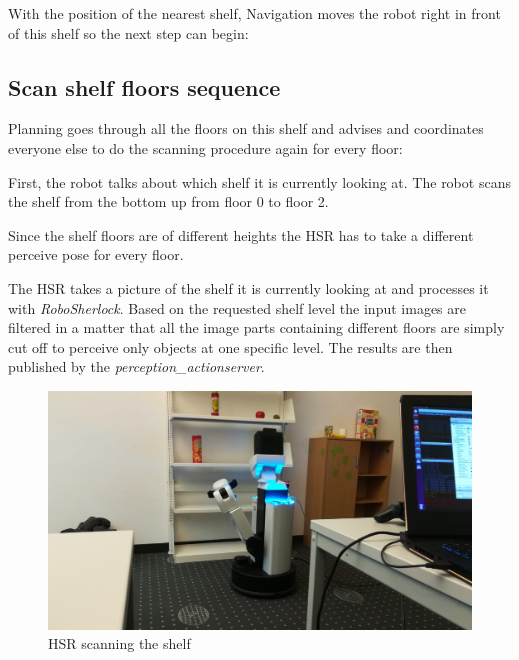 \documentclass[main.tex]{subfiles}
\begin{document}
	\begin{navigation}
	With the position of the nearest shelf, Navigation moves the robot right in front of this shelf so the next step can begin:
	\end{navigation}
	
	\subsection{Scan shelf floors sequence}
	
	\begin{planning}
	Planning goes through all the floors on this shelf and advises and coordinates everyone else to do the scanning procedure again for every floor:
	\end{planning}
	\begin{nlp}
	First, the robot talks about which shelf it is currently looking at. The robot scans the shelf from the bottom up from floor 0 to floor 2.\end{nlp}
	
	\begin{manipulation}
	Since the shelf floors are of different heights the HSR has to take a different perceive pose for every floor.
	\end{manipulation}
	
	\begin{perception}
	The HSR takes a picture of the shelf it is currently looking at and processes it with \textit{RoboSherlock}. Based on the requested shelf level the input images are filtered in a matter that all the image parts containing different floors are simply cut off to perceive only objects at one specific level. The results are then published by the \textit{perception\_actionserver}.
	\end{perception}
	
	\begin{figure}[H]
		\centering
		\includegraphics[scale=0.2]{pictures/shelf_scan}
		\caption{HSR scanning the shelf}
	\end{figure}
	
\end{document}
